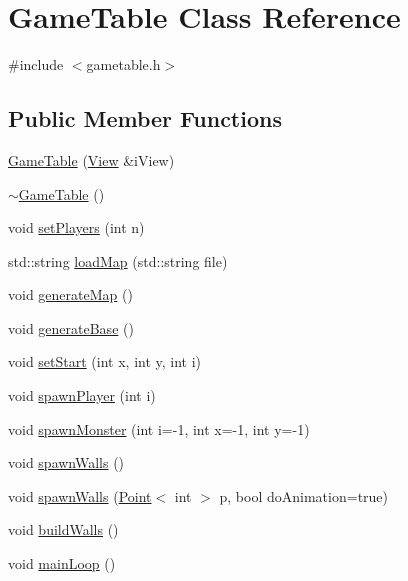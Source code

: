 \hypertarget{class_game_table}{\section{Game\-Table Class Reference}
\label{class_game_table}
}


{\ttfamily \#include $<$gametable.\-h$>$}

\subsection*{Public Member Functions}
\begin{DoxyCompactItemize}
\item 
\hyperlink{class_game_table_a8181bb1ba469353af8bb157439a0559f}{Game\-Table} (\hyperlink{class_view}{View} \&i\-View)
\item 
\hyperlink{class_game_table_a26af150d29ca306ce34bc4c21eff4434}{$\sim$\-Game\-Table} ()
\item 
void \hyperlink{class_game_table_aa038eb8097eec472d07778a3c637f439}{set\-Players} (int n)
\item 
std\-::string \hyperlink{class_game_table_a0d3a30f842c2a0a564a4a9790711a49d}{load\-Map} (std\-::string file)
\item 
void \hyperlink{class_game_table_a8a516c486ae6606739a9e3759351983c}{generate\-Map} ()
\item 
void \hyperlink{class_game_table_a74ce2ab48d21cdf50cc8cf0ca20dc6f6}{generate\-Base} ()
\item 
void \hyperlink{class_game_table_acb2b7d5332b5cd390e4d1c7f265c9f25}{set\-Start} (int x, int y, int i)
\item 
void \hyperlink{class_game_table_a833b9a8d434677b3186f83f29e4665f2}{spawn\-Player} (int i)
\item 
void \hyperlink{class_game_table_a8eec3746aac496efa42ccf855c09ee85}{spawn\-Monster} (int i=-\/1, int x=-\/1, int y=-\/1)
\item 
void \hyperlink{class_game_table_a32bf219b191b9dfec2ffb0944e3cba60}{spawn\-Walls} ()
\item 
void \hyperlink{class_game_table_adcbf40752d938e540143ae9f0557fe1d}{spawn\-Walls} (\hyperlink{class_point}{Point}$<$ int $>$ p, bool do\-Animation=true)
\item 
void \hyperlink{class_game_table_a7c069f3204763f1724ee32bbf811d8d2}{build\-Walls} ()
\item 
void \hyperlink{class_game_table_a792dea56e19cd3c484f43c2577a1ffbd}{main\-Loop} ()
\item 

\end{DoxyCompactItemize}
